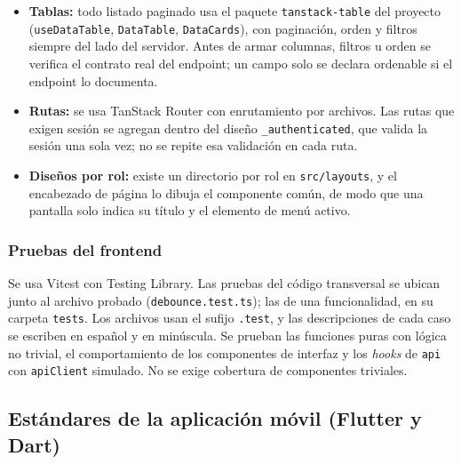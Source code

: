 \begin{itemize}
    \item \textbf{Tablas:} todo listado paginado usa el paquete \texttt{tanstack-table} del proyecto (\texttt{useDataTable}, \texttt{DataTable}, \texttt{DataCards}), con paginación, orden y filtros siempre del lado del servidor. Antes de armar columnas, filtros u orden se verifica el contrato real del endpoint; un campo solo se declara ordenable si el endpoint lo documenta.
    \item \textbf{Rutas:} se usa TanStack Router con enrutamiento por archivos. Las rutas que exigen sesión se agregan dentro del diseño \texttt{\_authenticated}, que valida la sesión una sola vez; no se repite esa validación en cada ruta.
    \item \textbf{Diseños por rol:} existe un directorio por rol en \texttt{src/layouts}, y el encabezado de página lo dibuja el componente común, de modo que una pantalla solo indica su título y el elemento de menú activo.
\end{itemize}

\subsubsection{Pruebas del frontend}

Se usa Vitest con Testing Library. Las pruebas del código transversal se ubican junto al archivo probado (\texttt{debounce.test.ts}); las de una funcionalidad, en su carpeta \texttt{tests}. Los archivos usan el sufijo \texttt{.test}, y las descripciones de cada caso se escriben en español y en minúscula. Se prueban las funciones puras con lógica no trivial, el comportamiento de los componentes de interfaz y los \textit{hooks} de \texttt{api} con \texttt{apiClient} simulado. No se exige cobertura de componentes triviales.

\subsection{Estándares de la aplicación móvil (Flutter y Dart)}


